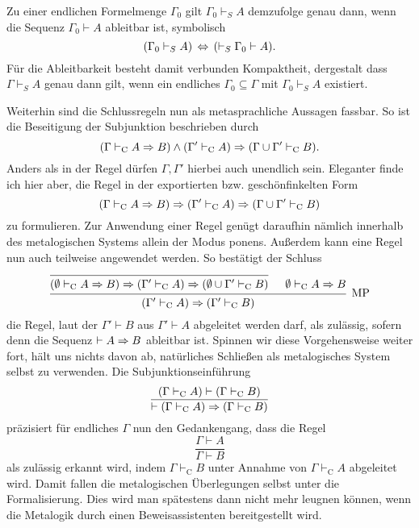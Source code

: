 Zu einer endlichen Formelmenge $\Gamma_0$ gilt $\Gamma_0\vdash_S A$
demzufolge genau dann, wenn die Sequenz $\Gamma_0\vdash A$
ableitbar ist, symbolisch%
\[(\Gamma_0\vdash_S A)\,\Leftrightarrow\, (\vdash_S \Gamma_0\vdash A).\]
Für die Ableitbarkeit besteht damit verbunden Kompaktheit, dergestalt
dass $\Gamma\vdash_S A$ genau dann gilt, wenn ein endliches
$\Gamma_0\subseteq\Gamma$ mit $\Gamma_0\vdash_S A$ existiert.

Weiterhin sind die Schlussregeln nun als metasprachliche Aussagen
fassbar. So ist die Beseitigung der Subjunktion beschrieben durch%
\[(\Gamma\vdash_{\mathrm C} A\Rightarrow B)\land (\Gamma'\vdash_{\mathrm C} A)
\Rightarrow (\Gamma\cup\Gamma'\vdash_{\mathrm C} B).\]
Anders als in der Regel dürfen $\Gamma,\Gamma'$ hierbei auch
unendlich sein. Eleganter finde ich hier aber, die Regel in der
exportierten bzw. geschönfinkelten Form
\[(\Gamma\vdash_{\mathrm C} A\Rightarrow B)\Rightarrow (\Gamma'\vdash_{\mathrm C} A)\Rightarrow
(\Gamma\cup\Gamma'\vdash_{\mathrm C} B)\]
zu formulieren. Zur Anwendung einer Regel genügt daraufhin nämlich
innerhalb des metalogischen Systems allein der Modus ponens. Außerdem
kann eine Regel nun auch teilweise angewendet werden. So bestätigt
der Schluss
\[\begin{prooftree}
  \infer0{(\emptyset\vdash_{\mathrm C} A\cond B)\cond (\Gamma'\vdash_{\mathrm C} A)
    \cond(\emptyset\cup\Gamma'\vdash_{\mathrm C} B)}
  \hypo{\emptyset\vdash_{\mathrm C} A\cond B}
\infer2[MP]{(\Gamma'\vdash_{\mathrm C} A)\cond (\Gamma'\vdash_{\mathrm C} B)}
\end{prooftree}\]
die Regel, laut der $\Gamma'\vdash B$
aus $\Gamma'\vdash A$ abgeleitet werden darf, als zulässig,
sofern denn die Sequenz $\vdash A\Rightarrow B$ ableitbar ist.
Spinnen wir diese Vorgehensweise weiter fort, hält uns nichts davon ab,
natürliches Schließen als metalogisches System selbst zu verwenden.
Die Subjunktionseinführung
\[\dfrac{(\Gamma\vdash_{\mathrm C} A)\vdash (\Gamma\vdash_{\mathrm C} B)}{
\vdash (\Gamma\vdash_{\mathrm C} A)\Rightarrow (\Gamma\vdash_{\mathrm C} B)}\]
präzisiert für endliches $\Gamma$ nun den Gedankengang, dass die Regel
\[\dfrac{\Gamma\vdash A}{\Gamma\vdash B}\]
als zulässig erkannt wird, indem $\Gamma\vdash_{\mathrm C} B$ unter
Annahme von $\Gamma\vdash_{\mathrm C} A$ abgeleitet wird. Damit fallen
die metalogischen Überlegungen selbst unter die Formalisierung. Dies
wird man spätestens dann nicht mehr leugnen können, wenn die
Metalogik durch einen Beweisassistenten bereitgestellt wird.

